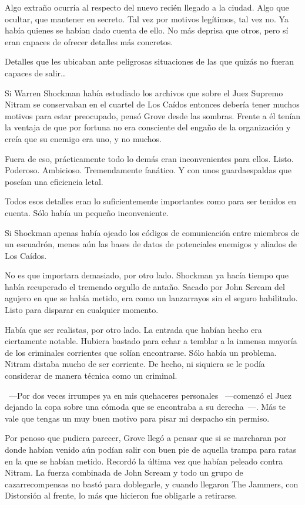 Algo extraño ocurría al respecto del nuevo recién llegado a la ciudad. Algo que ocultar, que mantener en secreto. Tal vez por motivos legítimos, tal vez no.
Ya había quienes se habían dado cuenta de ello. No más deprisa que otros, pero sí eran capaces de ofrecer detalles más concretos.

Detalles que les ubicaban ante peligrosas situaciones de las que quizás no fueran capaces de salir\dots

\fancyparbreak
Si Warren Shockman había estudiado los archivos que sobre el Juez Supremo Nitram se conservaban en el cuartel de Los Caídos entonces debería tener muchos motivos para estar preocupado, pensó Grove desde las sombras. Frente a él tenían la ventaja de que por fortuna no era consciente del engaño de la organización y creía que su enemigo era uno, y no muchos.

Fuera de eso, prácticamente todo lo demás eran inconvenientes para ellos. Listo. Poderoso. Ambicioso. Tremendamente fanático. Y con unos guardaespaldas que poseían una eficiencia letal.

Todos esos detalles eran lo suficientemente importantes como para ser tenidos en cuenta. Sólo había un pequeño inconveniente.

Si Shockman apenas había ojeado los códigos de comunicación entre miembros de un escuadrón, menos aún las bases de datos de potenciales enemigos y aliados de Los Caídos.

No es que importara demasiado, por otro lado. Shockman ya hacía tiempo que había recuperado el tremendo orgullo de antaño. Sacado por John Scream del agujero en que se había metido, era como un lanzarrayos sin el seguro habilitado. Listo para disparar en cualquier momento.

Había que ser realistas, por otro lado. La entrada que habían hecho era ciertamente notable. Hubiera bastado para echar a temblar a la inmensa mayoría de los criminales corrientes que solían encontrarse. Sólo había un problema. Nitram distaba mucho de ser corriente. De hecho, ni siquiera se le podía considerar de manera técnica como un criminal.

~---Por dos veces irrumpes ya en mis quehaceres personales ~---comenzó el Juez dejando la copa sobre una cómoda que se encontraba a su derecha~---. Más te vale que tengas un muy buen motivo para pisar mi despacho sin permiso.

Por penoso que pudiera parecer, Grove llegó a pensar que si se marcharan por donde habían venido aún podían salir con buen pie de aquella trampa para ratas en la que se habían metido. Recordó la última vez que habían peleado contra Nitram. La fuerza combinada de John Scream y todo un grupo de cazarrecompensas no bastó para doblegarle, y cuando llegaron The Jammers, con Distorsión al frente, lo más que hicieron fue obligarle a retirarse.

